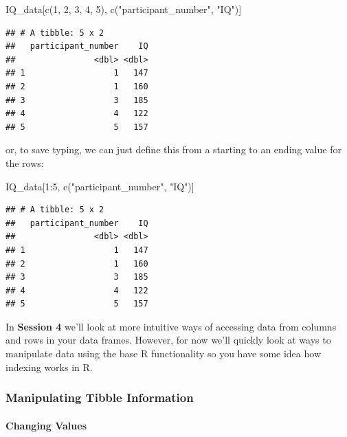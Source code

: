 \documentclass[
]{book}
\newenvironment{Shaded}{\begin{snugshade}}{\end{snugshade}}
\newcommand{\DecValTok}[1]{\textcolor[rgb]{0.00,0.00,0.81}{#1}}
\newcommand{\FunctionTok}[1]{\textcolor[rgb]{0.00,0.00,0.00}{#1}}
\newcommand{\NormalTok}[1]{#1}
\newcommand{\SpecialCharTok}[1]{\textcolor[rgb]{0.00,0.00,0.00}{#1}}
\newcommand{\StringTok}[1]{\textcolor[rgb]{0.31,0.60,0.02}{#1}}
\begin{document}
\begin{Shaded}
\begin{Highlighting}[]
\NormalTok{IQ\_data[}\FunctionTok{c}\NormalTok{(}\DecValTok{1}\NormalTok{, }\DecValTok{2}\NormalTok{, }\DecValTok{3}\NormalTok{, }\DecValTok{4}\NormalTok{, }\DecValTok{5}\NormalTok{), }\FunctionTok{c}\NormalTok{(}\StringTok{"participant\_number"}\NormalTok{, }\StringTok{"IQ"}\NormalTok{)]}
\end{Highlighting}
\end{Shaded}

\begin{verbatim}
## # A tibble: 5 x 2
##   participant_number    IQ
##                <dbl> <dbl>
## 1                  1   147
## 2                  1   160
## 3                  3   185
## 4                  4   122
## 5                  5   157
\end{verbatim}

or, to save typing, we can just define this from a starting to an ending value for the rows:

\begin{Shaded}
\begin{Highlighting}[]
\NormalTok{IQ\_data[}\DecValTok{1}\SpecialCharTok{:}\DecValTok{5}\NormalTok{, }\FunctionTok{c}\NormalTok{(}\StringTok{"participant\_number"}\NormalTok{, }\StringTok{"IQ"}\NormalTok{)]}
\end{Highlighting}
\end{Shaded}

\begin{verbatim}
## # A tibble: 5 x 2
##   participant_number    IQ
##                <dbl> <dbl>
## 1                  1   147
## 2                  1   160
## 3                  3   185
## 4                  4   122
## 5                  5   157
\end{verbatim}

In \textbf{Session 4} we'll look at more intuitive ways of accessing data from columns and rows in your data frames. However, for now we'll quickly look at ways to manipulate data using the base R functionality so you have some idea how indexing works in R.

\hypertarget{manipulating-tibble-information}{%
\subsubsection{Manipulating Tibble Information}\label{manipulating-tibble-information}}

\hypertarget{changing-values}{%
\paragraph{Changing Values}\label{changing-values}}
\end{document}

